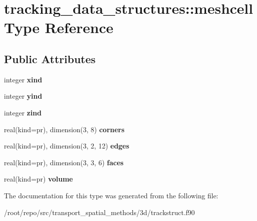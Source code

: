 \hypertarget{structtracking__data__structures_1_1meshcell}{}\section{tracking\+\_\+data\+\_\+structures\+:\+:meshcell Type Reference}
\label{structtracking__data__structures_1_1meshcell}
\subsection*{Public Attributes}
\begin{DoxyCompactItemize}
\item 
\mbox{\label{structtracking__data__structures_1_1meshcell_afd4a41c0924cdfa672043dff98383247}} 
integer {\bfseries xind}
\item 
\mbox{\label{structtracking__data__structures_1_1meshcell_aaf221593bf60310472dfdcc78d6c2e79}} 
integer {\bfseries yind}
\item 
\mbox{\label{structtracking__data__structures_1_1meshcell_ae19a4af32e3f12bfa8042da05505aa6e}} 
integer {\bfseries zind}
\item 
\mbox{\label{structtracking__data__structures_1_1meshcell_a13fcf4021ce5a5d1579ffbff38aaf33d}} 
real(kind=pr), dimension(3, 8) {\bfseries corners}
\item 
\mbox{\label{structtracking__data__structures_1_1meshcell_a4edd8593d1bb0badbc5d723780d2c6c5}} 
real(kind=pr), dimension(3, 2, 12) {\bfseries edges}
\item 
\mbox{\label{structtracking__data__structures_1_1meshcell_a8b0a596007ab35b13961d9037d7b6e44}} 
real(kind=pr), dimension(3, 3, 6) {\bfseries faces}
\item 
\mbox{\label{structtracking__data__structures_1_1meshcell_a1a08090e934eae80b9b27f55c4ccaa00}} 
real(kind=pr) {\bfseries volume}
\end{DoxyCompactItemize}


The documentation for this type was generated from the following file\+:\begin{DoxyCompactItemize}
\item 
/root/repo/src/transport\+\_\+spatial\+\_\+methods/3d/trackstruct.\+f90\end{DoxyCompactItemize}

